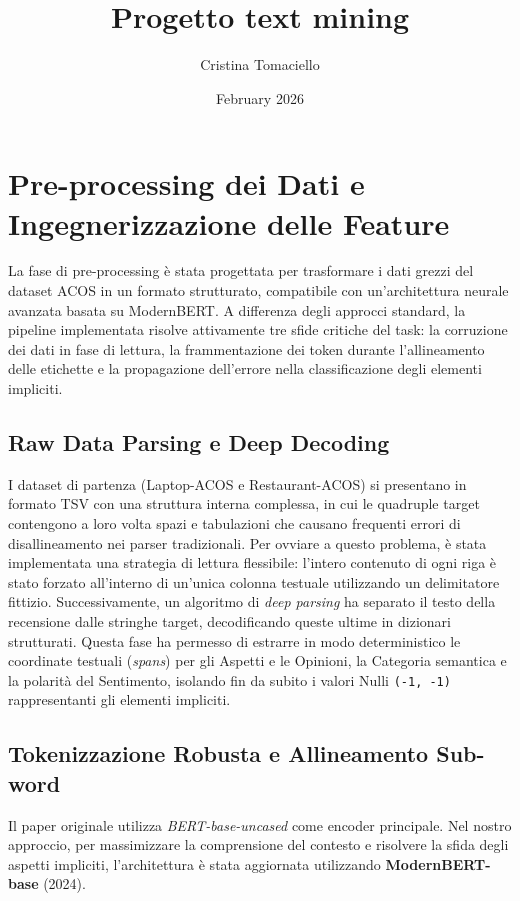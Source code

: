 \documentclass[10pt,a4paper]{report}
\title{Progetto text mining}
\author{Cristina Tomaciello}
\date{February 2026}
\begin{document}
\maketitle

\tableofcontents

\chapter{Pre-processing dei Dati e Ingegnerizzazione delle Feature}
\label{sec:preprocessing}

La fase di pre-processing è stata progettata per trasformare i dati grezzi del dataset ACOS in un formato strutturato, compatibile con un'architettura neurale avanzata basata su ModernBERT. A differenza degli approcci standard, la pipeline implementata risolve attivamente tre sfide critiche del task: la corruzione dei dati in fase di lettura, la frammentazione dei token durante l'allineamento delle etichette e la propagazione dell'errore nella classificazione degli elementi impliciti.

\section{Raw Data Parsing e Deep Decoding}
I dataset di partenza (Laptop-ACOS e Restaurant-ACOS) si presentano in formato TSV con una struttura interna complessa, in cui le quadruple target contengono a loro volta spazi e tabulazioni che causano frequenti errori di disallineamento nei parser tradizionali. 
Per ovviare a questo problema, è stata implementata una strategia di lettura flessibile: l'intero contenuto di ogni riga è stato forzato all'interno di un'unica colonna testuale utilizzando un delimitatore fittizio. Successivamente, un algoritmo di \textit{deep parsing} ha separato il testo della recensione dalle stringhe target, decodificando queste ultime in dizionari strutturati. Questa fase ha permesso di estrarre in modo deterministico le coordinate testuali (\textit{spans}) per gli Aspetti e le Opinioni, la Categoria semantica e la polarità del Sentimento, isolando fin da subito i valori Nulli \texttt{(-1, -1)} rappresentanti gli elementi impliciti.

\section{Tokenizzazione Robusta e Allineamento Sub-word}
Il paper originale utilizza \textit{BERT-base-uncased} come encoder principale. Nel nostro approccio, per massimizzare la comprensione del contesto e risolvere la sfida degli aspetti impliciti, l'architettura è stata aggiornata utilizzando \textbf{ModernBERT-base} (2024).
\end{document}
